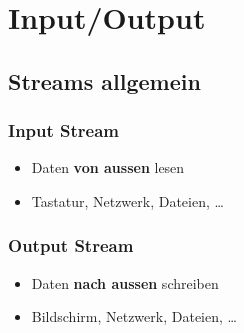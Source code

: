 \section{Input/Output}

\subsection{Streams allgemein}
\vspace{-0.7\abovedisplayskip}
\begin{minipage}[t]{0.5\columnwidth}
    \subsubsection{Input Stream}
    \begin{itemize}
        \item Daten \textbf{von aussen} lesen
        \item Tastatur, Netzwerk, Dateien, \ldots
    \end{itemize}
\end{minipage}\hfill%
\begin{minipage}[t]{0.49\columnwidth}
    \subsubsection{Output Stream}
    \begin{itemize}
        \item Daten \textbf{nach aussen} schreiben
        \item Bildschirm, Netzwerk, Dateien, \ldots
    \end{itemize}
\end{minipage}

